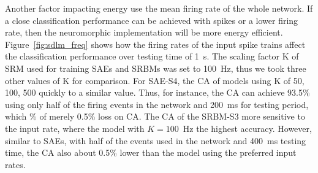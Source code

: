 \DIFaddend Another factor impacting energy use \DIFdelbegin {}\DIFdelend \DIFaddbegin {}\DIFaddend the mean firing rate of the whole network.
If a close classification performance can be achieved with \DIFdelbegin {}\DIFdelend \DIFaddbegin {}\DIFaddend spikes or a lower firing rate, then the neuromorphic implementation will be more energy efficient.
Figure~\ref{fig:sdlm_freq} shows how the firing rates of the input spike trains affect the classification performance over \DIFaddbegin {}\DIFaddend testing time of 1~s.
The scaling factor K of SRM used for training SAEs and SRBMs was set to 100~Hz, thus we took three other values of K for comparison.
For SAE-S4, the CA of models using K of 50, 100, 500 \DIFdelbegin {}\DIFdelend \DIFaddbegin {}\DIFaddend quickly to a similar value.
Thus, for instance, the CA can achieve 93.5\% using only half of the firing events in the network and 200~ms for \DIFaddbegin {}\DIFaddend testing period, which \DIFdelbegin {}\DIFdelend \DIFaddbegin {}\% of \DIFdelbegin {}\DIFdelend \DIFaddbegin {}\DIFaddend merely 0.5\% loss on CA\DIFdelbegin {}\DIFdelend .
The CA of the SRBM-S3 \DIFdelbegin {}\DIFdelend \DIFaddbegin {}\DIFaddend more sensitive to the input rate, where the model with $K=100$~Hz \DIFdelbegin {}\DIFdelend \DIFaddbegin {}\DIFaddend the highest accuracy.
However, similar to SAEs, with half of the events used in the network and 400~ms testing time, the CA \DIFdelbegin {}\DIFdelend \DIFaddbegin {}\DIFaddend also about 0.5\% lower than the model using the preferred input rates.

